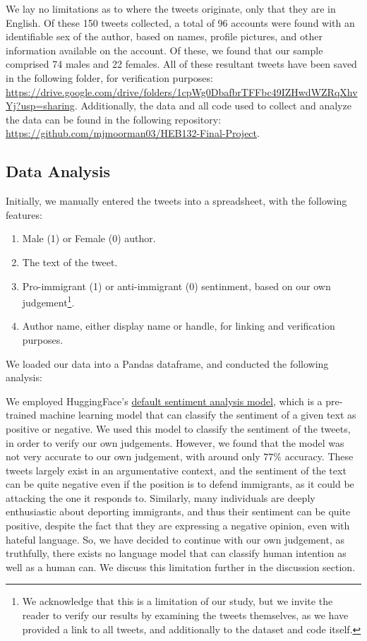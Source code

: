 \documentclass{article}
\begin{document}
We lay no limitations as to where the tweets originate, only that they are in English. Of these 150 tweets collected, a total of 96 accounts were found with an identifiable sex of the author, based on names, profile pictures, and other information available on the account. Of these, we found that our sample comprised 74 males and 22 females. All of these resultant tweets have been saved in the following folder, for verification purposes: \url{https://drive.google.com/drive/folders/1cpWg0DbafbrTFFbc49IZHwdWZRqXhvYj?usp=sharing}. Additionally, the data and all code used to collect and analyze the data can be found in the following repository: \url{https://github.com/mjmoorman03/HEB132-Final-Project}.

\subsection{Data Analysis}
Initially, we manually entered the tweets into a spreadsheet, with the following features:
\begin{enumerate}
    \item Male (1) or Female (0) author.
    \item The text of the tweet.
    \item Pro-immigrant (1) or anti-immigrant (0) sentinment, based on our own judgement\footnote{We acknowledge that this is a limitation of our study, but we invite the reader to verify our results by examining the tweets themselves, as we have provided a link to all tweets, and additionally to the dataset and code itself.}.
    \item Author name, either display name or handle, for linking and verification purposes.
\end{enumerate}

We loaded our data into a Pandas dataframe, and conducted the following analysis:

We employed HuggingFace's \href{https://huggingface.co/distilbert/distilbert-base-uncased-finetuned-sst-2-english?text=the+rainy+day+made+him+feel+quite+down}{default sentiment analysis model}, which is a pre-trained machine learning model that can classify the sentiment of a given text as positive or negative. We used this model to classify the sentiment of the tweets, in order to verify our own judgements. However, we found that the model was not very accurate to our own judgement, with around only $77\%$ accuracy. These tweets largely exist in an argumentative context, and the sentiment of the text can be quite negative even if the position is to defend immigrants, as it could be attacking the one it responds to. Similarly, many individuals are deeply enthusiastic about deporting immigrants, and thus their sentiment can be quite positive, despite the fact that they are expressing a negative opinion, even with hateful language. So, we have decided to continue with our own judgement, as truthfully, there exists no language model that can classify human intention as well as a human can. We discuss this limitation further in the discussion section.
\end{document}

